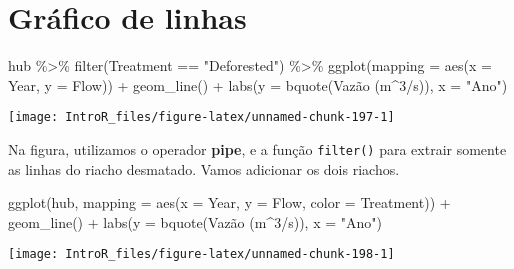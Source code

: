 \documentclass[
]{book}
\newenvironment{Shaded}{\begin{snugshade}}{\end{snugshade}}
\newcommand{\AttributeTok}[1]{\textcolor[rgb]{0.77,0.63,0.00}{#1}}
\newcommand{\DecValTok}[1]{\textcolor[rgb]{0.00,0.00,0.81}{#1}}
\newcommand{\FunctionTok}[1]{\textcolor[rgb]{0.00,0.00,0.00}{#1}}
\newcommand{\NormalTok}[1]{#1}
\newcommand{\SpecialCharTok}[1]{\textcolor[rgb]{0.00,0.00,0.00}{#1}}
\newcommand{\StringTok}[1]{\textcolor[rgb]{0.31,0.60,0.02}{#1}}
\begin{document}
\hypertarget{gruxe1fico-de-linhas}{%
\section{Gráfico de linhas}\label{gruxe1fico-de-linhas}}

\begin{Shaded}
\begin{Highlighting}[]
\NormalTok{hub }\SpecialCharTok{\%\textgreater{}\%} 
  \FunctionTok{filter}\NormalTok{(Treatment }\SpecialCharTok{==} \StringTok{"Deforested"}\NormalTok{) }\SpecialCharTok{\%\textgreater{}\%} 
  \FunctionTok{ggplot}\NormalTok{(}\AttributeTok{mapping =} \FunctionTok{aes}\NormalTok{(}\AttributeTok{x =}\NormalTok{ Year, }\AttributeTok{y =}\NormalTok{ Flow)) }\SpecialCharTok{+}
    \FunctionTok{geom\_line}\NormalTok{() }\SpecialCharTok{+}
    \FunctionTok{labs}\NormalTok{(}\AttributeTok{y =} \FunctionTok{bquote}\NormalTok{(Vazão (m}\SpecialCharTok{\^{}}\DecValTok{3}\SpecialCharTok{/}\NormalTok{s)),}
         \AttributeTok{x =} \StringTok{"Ano"}\NormalTok{)}
\end{Highlighting}
\end{Shaded}

\begin{center}\texttt{[image: IntroR\_files/figure-latex/unnamed-chunk-197-1]} \end{center}

Na figura, utilizamos o operador \textbf{pipe}, e a função \texttt{filter()} para extrair somente as linhas do riacho desmatado. Vamos adicionar os dois riachos.

\begin{Shaded}
\begin{Highlighting}[]
\FunctionTok{ggplot}\NormalTok{(hub, }\AttributeTok{mapping =} \FunctionTok{aes}\NormalTok{(}\AttributeTok{x =}\NormalTok{ Year, }\AttributeTok{y =}\NormalTok{ Flow, }\AttributeTok{color =}\NormalTok{ Treatment)) }\SpecialCharTok{+}
  \FunctionTok{geom\_line}\NormalTok{() }\SpecialCharTok{+}
  \FunctionTok{labs}\NormalTok{(}\AttributeTok{y =} \FunctionTok{bquote}\NormalTok{(Vazão (m}\SpecialCharTok{\^{}}\DecValTok{3}\SpecialCharTok{/}\NormalTok{s)),}
         \AttributeTok{x =} \StringTok{"Ano"}\NormalTok{)}
\end{Highlighting}
\end{Shaded}

\begin{center}\texttt{[image: IntroR\_files/figure-latex/unnamed-chunk-198-1]} \end{center}
\end{document}
